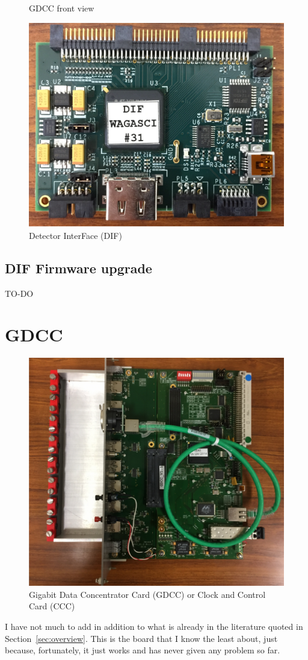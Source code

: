 \begin{figure}[H]
\begin{minipage}{0.2\linewidth}
  \caption{GDCC front view}\label{fig:GDCC-front-view}
  \end{minipage}%
  \begin{minipage}{0.7\linewidth}
  \centering \includegraphics[width=0.9\linewidth, frame]{DIF}
  \caption{Detector InterFace (DIF)}
  \end{minipage}
\end{figure}

\subsection{DIF Firmware upgrade}

TO-DO

\section{GDCC}
\begin{figure}[ht]
  \centering
    \includegraphics[width=0.7\linewidth, frame]{GDCC}
    \caption{Gigabit Data Concentrator Card (GDCC) or Clock and Control Card (CCC)}
  \end{figure}
I have not much to add in addition to what is already in the literature
quoted in Section~\ref{sec:overview}. This is the board that I know
the least about, just because, fortunately, it just works and has
never given any problem so far.

